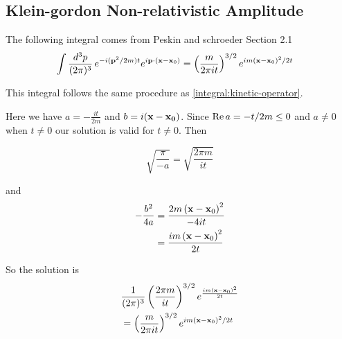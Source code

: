 \subsection{Klein-gordon Non-relativistic Amplitude} \label{ps-kg:nonrelativistic-propagator}

The following integral comes from Peskin and schroeder Section 2.1
\begin{align}
\int \frac{d^3p}{(2\pi)^3} \, e^{-i(\boldsymbol{\mathbf{p}}^2/2m)t} e^{i\boldsymbol{\mathbf{p}}\cdot(\boldsymbol{\mathbf{x}}-\boldsymbol{\mathbf{x}}_0)}
&= \left( \frac{m}{2\pi i t} \right)^{3/2} e^{im (\boldsymbol{\mathbf{x}}-\boldsymbol{\mathbf{x}}_0)^2 /2t}
\end{align}

This integral follows the same procedure as \ref{integral:kinetic-operator}.

Here we have $a = -\frac{it}{2m}$ and $b = i(\boldsymbol{\mathbf{x}}-\boldsymbol{\mathbf{x_0}})$.
Since $\operatorname{Re}{a} = -t/2m \leq 0$ and $a\neq 0$ when $t\neq 0$ our solution is valid for $t\neq 0$.
Then

$$
\sqrt{ \frac{\pi}{-a} } = \sqrt{ \frac{2\pi m}{it} }
$$

and
\begin{align*}
-\frac{b^2}{4a} &= \frac{2m \left(\boldsymbol{\mathbf{x}}-\boldsymbol{\mathbf{x}}_0\right)^2}{-4it} \\
&= \frac{im \left(\boldsymbol{\mathbf{x}}-\boldsymbol{\mathbf{x}}_0\right)^2}{2t}
\end{align*}

So the solution is
\begin{align*}
& \frac{1}{(2\pi)^3} \left( \frac{2\pi m}{it} \right)^{3/2} e^{\frac{im \left(\boldsymbol{\mathbf{x}}-\boldsymbol{\mathbf{x}}_0\right)^2}{2t}} \\
&= \left( \frac{m}{2\pi it} \right)^{3/2} e^{im \left(\boldsymbol{\mathbf{x}}-\boldsymbol{\mathbf{x}}_0\right)^2 /2t}
\end{align*}